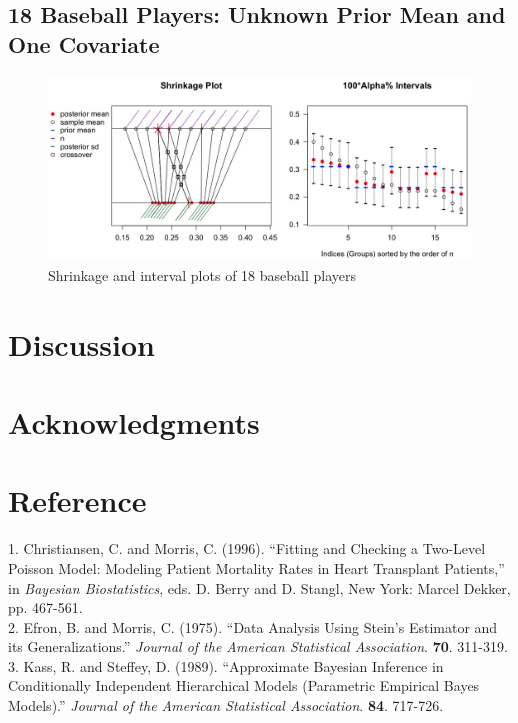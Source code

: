 \documentclass[article]{jss}
\begin{document}
\subsection[Unknown Second-level Mean and One Covariate]{18 Baseball Players: Unknown Prior Mean and One Covariate}
\begin{figure}[h]
\begin{center}
\includegraphics[scale=0.3]{baseball1.png}
\caption{Shrinkage and interval plots of 18 baseball players}
\end{center}
\end{figure}

\section[Discussion]{Discussion}

\section[acknowledgments]{Acknowledgments}

\section[Reference]{Reference}
1. Christiansen, C. and Morris, C. (1996). ``Fitting and Checking a Two-Level Poisson Model: Modeling Patient Mortality Rates in Heart Transplant Patients,'' in \emph{Bayesian Biostatistics}, eds. D. Berry and D. Stangl, New York: Marcel Dekker, pp. 467-561.
\\

2. Efron, B. and Morris, C. (1975). ``Data Analysis Using Stein's Estimator and its Generalizations.'' \emph{Journal of the American Statistical Association}. \textbf{70}. 311-319.
\\

3. Kass, R. and Steffey, D. (1989). ``Approximate Bayesian Inference in Conditionally Independent Hierarchical Models (Parametric
Empirical Bayes Models).'' \emph{Journal of the American Statistical Association}. \textbf{84}. 717-726.
\\
\end{document}
